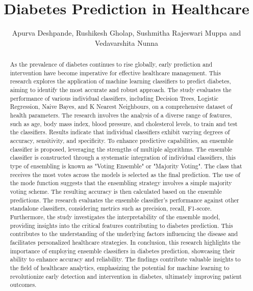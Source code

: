 \documentclass[11pt]{article}
\title{Diabetes Prediction in Healthcare}
\author{Apurva Deshpande, Rushikesh Gholap, Sushmitha Rajeswari Muppa and Vedavarshita Nunna}
\date{} %
\begin{document}
\maketitle

\begin{abstract}

  As the prevalence of diabetes continues to rise globally, early prediction and intervention have become imperative for effective healthcare management. This research explores the application of machine learning classifiers to predict diabetes, aiming to identify the most accurate and robust approach. The study evaluates the performance of various individual classifiers, including Decision Trees, Logistic Regression, Naive Bayes, and K Nearest Neighbours, on a comprehensive dataset of health parameters. The research involves the analysis of a diverse range of features, such as age, body mass index, blood pressure, and cholesterol levels, to train and test the classifiers. Results indicate that individual classifiers exhibit varying degrees of accuracy, sensitivity, and specificity. To enhance predictive capabilities, an ensemble classifier is proposed, leveraging the strengths of multiple algorithms. The ensemble classifier is constructed through a systematic integration of individual classifiers, this type of ensembling is known as "Voting Ensemble" or "Majority Voting". The class that receives the most votes across the models is selected as the final prediction. The use of the mode function suggests that the ensembling strategy involves a simple majority voting scheme. The resulting accuracy is then calculated based on the ensemble predictions. The research evaluates the ensemble classifier's performance against other standalone classifiers, considering metrics such as precision, recall, F1-score. Furthermore, the study investigates the interpretability of the ensemble model, providing insights into the critical features contributing to diabetes prediction. This contributes to the understanding of the underlying factors influencing the disease and facilitates personalized healthcare strategies. In conclusion, this research highlights the importance of employing ensemble classifiers in diabetes prediction, showcasing their ability to enhance accuracy and reliability. The findings contribute valuable insights to the field of healthcare analytics, emphasizing the potential for machine learning to revolutionize early detection and intervention in diabetes, ultimately improving patient outcomes.
  
\end{abstract}
\end{document}
